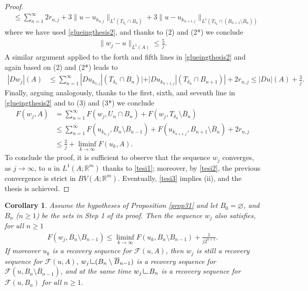 \documentclass[a4paper,11pt]{article}
\numberwithin{equation}{section}
\newtheorem{cor}[theorem]{Corollary}
\newcommand{\R}{\mathbb{R}}
\newcommand{\res}      {\mathop{\hbox{\vrule height 7pt width .5pt depth
                        0pt\vrule height .5pt width 6pt depth 0pt}}\nolimits}
\begin{document}
\begin{proof}
\begin{align*}
&\leq \sum_{n=1}^\infty 2r_{n,j}+3\|u-u_{k_{n,j}}\|_{L^1(T_{\delta_n}\cap B_n)}+3\|u-u_{k_{n+1,j}}\|_{L^1(T_{\delta_n}\cap (B_{n+1}\setminus\overline B_n))}
\end{align*}
where we have used \eqref{glueingthesis2}, and thanks to (2) and (2*) we conclude
\begin{align}\label{tesi1}
	\|w_j-u\|_{L^1(A)}\leq\frac5j.
\end{align}
A similar argument applied to the forth and fifth lines in \eqref{glueingthesis2} and again based on (2) and (2*) leads to
\begin{align}\label{tesi2}
	|Dw_j|(A)&\leq \sum_{n=1}^{\infty}|Du_{k_{n,j}}|(T_{\delta_n}\cap B_n )|+|Du_{k_{n+1,j}}|(T_{\delta_n}\cap B_{n+1} )|+2r_{n,j}\leq |Du|(A)+\frac3j.
\end{align}
Finally, arguing analogously, thanks to the first, sixth, and seventh line in \eqref{glueingthesis2} and to (3) and (3*) we conclude 
\begin{align}\label{tesi3}
F(w_j,A)&=\sum_{n=1}^\infty F(w_j,U_n\cap   B_{n})+F(w_j,T_{\delta_n}\setminus \overline B_{n})\nonumber\\
&\leq \sum_{n=1}^\infty F(u_{k_{n,j}}, B_{n}\setminus\overline  B_{n-1})+F(u_{k_{n+1,j}},B_{n+1}\setminus\overline  B_{n})+2r_{n,j}\nonumber\\
&\leq \frac2j+\liminf_{k\rightarrow \infty}F(u_k,A).
\end{align}
To conclude the proof, it is sufficient to observe that the sequence $w_j$ converges, as $j\rightarrow \infty$, to $u$ in $L^1(A;\R^m)$ thanks to \eqref{tesi1}; moreover, by \eqref{tesi2}, the previous convergence is strict in $BV(A;\R^m)$. Eventually, \eqref{tesi3} implies (ii), and the thesis is achieved.
%
%
%
%
%
%
%
%
%
%
%
%
\end{proof}
\begin{cor}\label{cor_main}
Assume the  hypotheses of Proposition \ref{prop31} and let $B_0=\varnothing$, and  $B_n$ ($n\geq1$) be the sets in Step 1 of its proof. Then the sequence $w_j$ also satisfies, for all $n\geq1$
\begin{align}\label{ineq37}
F(w_j,B_n\setminus B_{n-1})\leq \liminf_{k\rightarrow \infty}F(u_k,B_n\setminus B_{n-1})+\frac{1}{j2^{n+1}}.
\end{align}
If moreover $u_k$ is a recovery sequence for $\mathcal F(u,A)$, then $w_j$ is still a  recovery sequence for  $\mathcal F(u,A)$, $w_j\res (B_n\setminus \overline B_{n-1})$ is a recovery sequence for $\mathcal F(u,B_n\setminus \overline B_{n-1})$, and at the same time $w_j\res B_n$ is a recovery sequence for $\mathcal F(u,B_n)$ for all $n\geq1$.
\end{cor}
\end{document}
